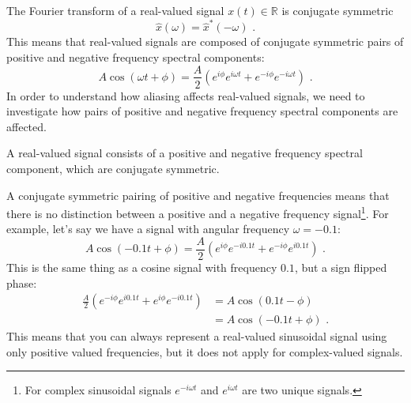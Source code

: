 The Fourier transform of a real-valued signal $x(t)\in\mathbb{R}$ is conjugate symmetric
\begin{equation}
  \hat{x}(\omega) = \hat{x}^*(-\omega)\,\,.
\end{equation}
This means that real-valued signals are composed of conjugate
symmetric pairs of positive and negative frequency spectral
components:
\begin{equation}
  A \cos(\omega t + \phi) = \frac{A}{2}(e^{i\phi}e^{i\omega t} + e^{-i\phi}e^{-i\omega t})\,\,.
\end{equation}
In order to understand how aliasing affects real-valued signals, we
need to investigate how pairs of positive and negative frequency spectral components are affected.
\begin{marginfigure}
  \begin{center}
  \end{center}
  \caption{A real-valued signal consists of a positive and negative frequency spectral component, 
  which are conjugate symmetric.}
\end{marginfigure}
A conjugate symmetric pairing of positive and negative frequencies means that there is no 
distinction between a positive and a negative frequency signal\footnote{For complex 
sinusoidal signals $e^{-i \omega t}$ and $e^{i \omega t}$ are two unique signals.}.
For example, let's say we have a signal with angular frequency $\omega = -0.1$:
\begin{equation}
  A \cos(-0.1 t + \phi) = \frac{A}{2}(e^{i\phi}e^{-i0.1  t} + e^{-i\phi}e^{i0.1 t})\,\,.
\end{equation}
This is the same thing as a cosine signal with frequency $0.1$, but a sign flipped phase:
\begin{align}
  \frac{A}{2}(e^{-i\phi}e^{i 0.1 t} + e^{i\phi}e^{-i 0.1 t}) & = A \cos(0.1 t - \phi)       \\
                                                             & = A \cos(-0.1 t + \phi)\,\,.
\end{align}
This means that you can always represent a real-valued sinusoidal signal using only 
positive valued frequencies, but it does not apply for complex-valued signals.

